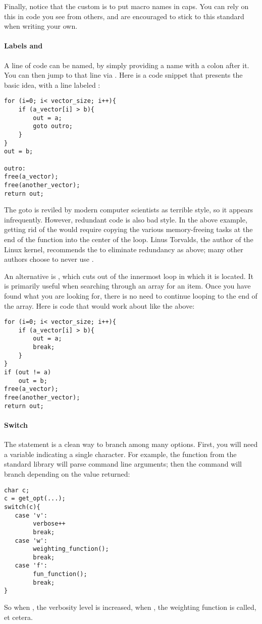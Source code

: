 Finally, notice that the custom is to put macro names in caps.  You can
rely on this in code you see from others, and are encouraged to stick
to this standard when writing your own.

\paragraph{Labels and } 
A line of code can be named, by simply providing a
name with a colon after it. You can then jump to that line via . Here is a code snippet that presents the basic idea, with a line labeled :
\begin{lstlisting}
for (i=0; i< vector_size; i++){
    if (a_vector[i] > b){
        out = a;
        goto outro;
    }
}
out = b;

outro:
free(a_vector);
free(another_vector);
return out;
\end{lstlisting}
The goto is reviled by modern computer scientists as terrible style, so
it appears infrequently. However, redundant code is also bad style. 
In the above example, getting rid of the  would require copying
the various memory-freeing tasks at the end of the function into the
center of the  loop.  Linus Torvalds,
the author of the Linux kernel, recommends the  to eliminate
redundancy as above; many other authors choose to never use .

An alternative is , which cuts out of the innermost loop in
which it is located. It is primarily useful when searching through an
array for an item. Once you have found what you are looking for, there
is no need to continue looping to the end of the array.
Here is code that would work about like the above:
\begin{lstlisting}
for (i=0; i< vector_size; i++){
    if (a_vector[i] > b){
        out = a;
        break;
    }
}
if (out != a)
    out = b;
free(a_vector);
free(another_vector);
return out;
\end{lstlisting}

\paragraph{Switch} The  statement is a clean way to
branch among many options. First, you will need a variable indicating
a single character. For example, the  function from the
standard library will parse command line arguments; then the 
command will branch depending on the value returned:
\begin{lstlisting}
char c;
c = get_opt(...);
switch(c){
   case 'v':
        verbose++
        break;
   case 'w':    
        weighting_function();
        break;
   case 'f':      
        fun_function();
        break;
}
\end{lstlisting}
So when 
, the verbosity level is increased,
when , the weighting function is called, 
et cetera.

